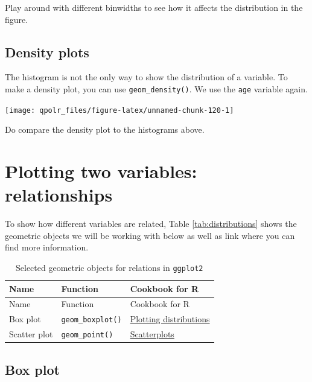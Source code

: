 \documentclass[12pt,oneside]{reedthesis}
\theoremstyle{definition}
\theoremstyle{definition}
\theoremstyle{definition}
\theoremstyle{remark}
\begin{document}
  Play around with different binwidths to see how it affects the
  distribution in the figure.
  
  \subsection{Density plots}\label{density-plots}
  
  The histogram is not the only way to show the distribution of a
  variable. To make a density plot, you can use \texttt{geom\_density()}.
  We use the \texttt{age} variable again.
  \begin{Shaded}
  \begin{Highlighting}[]
  \NormalTok{(}\OperatorTok{+}
  \StringTok{  }\NormalTok{() }
  \end{Highlighting}
  \end{Shaded}
  \begin{center}\texttt{[image: qpolr\_files/figure-latex/unnamed-chunk-120-1]} \end{center}
  
  Do compare the density plot to the histograms above.
  
  \section{Plotting two variables:
  relationships}\label{plotting-two-variables-relationships}
  
  To show how different variables are related, Table
  \ref{tab:distributions} shows the geometric objects we will be working
  with below as well as link where you can find more information.
  \begin{longtable}[]{@{}lll@{}}
  \caption{\label{tab:relationships} Selected geometric objects for relations
  in \texttt{ggplot2}}\tabularnewline
  \toprule
  Name & Function & Cookbook for R\tabularnewline
  \midrule
  \endfirsthead
  \toprule
  Name & Function & Cookbook for R\tabularnewline
  \midrule
  \endhead
  Box plot & \texttt{geom\_boxplot()} &
  \href{http://www.cookbook-r.com/Graphs/Plotting_distributions_(ggplot2)/}{Plotting
  distributions}\tabularnewline
  Scatter plot & \texttt{geom\_point()} &
  \href{http://www.cookbook-r.com/Graphs/Scatterplots_(ggplot2)/}{Scatterplots}\tabularnewline
  \bottomrule
  \end{longtable}
  \subsection{Box plot}\label{box-plot}
  
\end{document}
